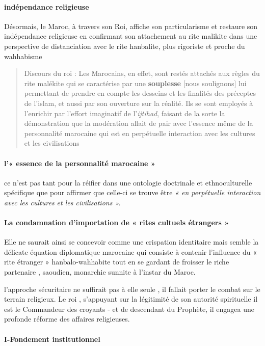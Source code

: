  \paragraph{indépendance religieuse} Désormais, le Maroc, à travers son Roi, affiche son particularisme et restaure son indépendance religieuse en confirmant son attachement au rite malikite dans une perspective de distanciation avec le rite hanbalite, plus rigoriste et proche du wahhabisme
 \begin{quote}
      Discours du roi : Les Marocains, en effet, sont restés attachés aux règles du rite malékite qui se caractérise par une \textbf{souplesse} [nous soulignons] lui permettant de prendre en compte les desseins et les finalités des préceptes de l'islam, et aussi par son ouverture sur la réalité.
      Ils se sont employés à l'enrichir par l'effort imaginatif de l'\textit{ijtihad}, faisant de la sorte la démonstration que la modération allait de pair avec l'essence même de la personnalité marocaine qui est en perpétuelle interaction avec les cultures et les civilisations
 \end{quote}

\paragraph{l'« essence de la personnalité marocaine »}
 ce n'est pas tant pour la réifier dans une ontologie doctrinale et ethnoculturelle spécifique que pour affirmer que celle-ci se trouve être \textit{« en perpétuelle interaction avec les cultures et les civilisations ».}

 \paragraph{La condamnation d'importation de « rites cultuels étrangers »}
   Elle ne saurait ainsi se concevoir comme une crispation identitaire mais semble la délicate équation diplomatique marocaine qui consiste à contenir l'influence du « rite étranger » hanbalo-wahhabite tout en se gardant de froisser le riche partenaire , saoudien, monarchie sunnite à l'instar du Maroc.

  l'approche sécuritaire ne suffirait pas à elle seule , il fallait porter le combat sur le terrain religieux.
 Le roi , s'appuyant sur la légitimité de son autorité spirituelle il est le Commandeur des croyants - et de descendant du Prophète, il engagea une profonde réforme des affaires religieuses.

\paragraph{I-Fondement institutionnel}

